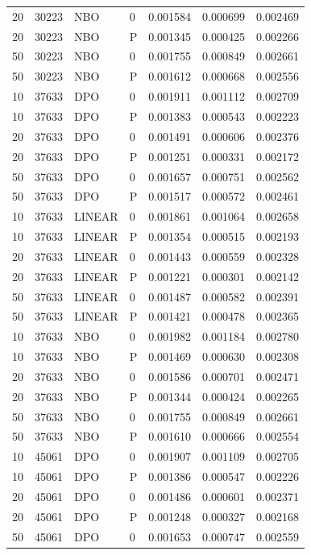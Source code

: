 \begin{longtable}{rrllrrr}
20 & 30223 & NBO & 0 & 0.001584 & 0.000699 & 0.002469\\
20 & 30223 & NBO & P & 0.001345 & 0.000425 & 0.002266\\
50 & 30223 & NBO & 0 & 0.001755 & 0.000849 & 0.002661\\
50 & 30223 & NBO & P & 0.001612 & 0.000668 & 0.002556\\
10 & 37633 & DPO & 0 & 0.001911 & 0.001112 & 0.002709\\
10 & 37633 & DPO & P & 0.001383 & 0.000543 & 0.002223\\
20 & 37633 & DPO & 0 & 0.001491 & 0.000606 & 0.002376\\
20 & 37633 & DPO & P & 0.001251 & 0.000331 & 0.002172\\
50 & 37633 & DPO & 0 & 0.001657 & 0.000751 & 0.002562\\
50 & 37633 & DPO & P & 0.001517 & 0.000572 & 0.002461\\
10 & 37633 & LINEAR & 0 & 0.001861 & 0.001064 & 0.002658\\
10 & 37633 & LINEAR & P & 0.001354 & 0.000515 & 0.002193\\
20 & 37633 & LINEAR & 0 & 0.001443 & 0.000559 & 0.002328\\
20 & 37633 & LINEAR & P & 0.001221 & 0.000301 & 0.002142\\
50 & 37633 & LINEAR & 0 & 0.001487 & 0.000582 & 0.002391\\
50 & 37633 & LINEAR & P & 0.001421 & 0.000478 & 0.002365\\
10 & 37633 & NBO & 0 & 0.001982 & 0.001184 & 0.002780\\
10 & 37633 & NBO & P & 0.001469 & 0.000630 & 0.002308\\
20 & 37633 & NBO & 0 & 0.001586 & 0.000701 & 0.002471\\
20 & 37633 & NBO & P & 0.001344 & 0.000424 & 0.002265\\
50 & 37633 & NBO & 0 & 0.001755 & 0.000849 & 0.002661\\
50 & 37633 & NBO & P & 0.001610 & 0.000666 & 0.002554\\
10 & 45061 & DPO & 0 & 0.001907 & 0.001109 & 0.002705\\
10 & 45061 & DPO & P & 0.001386 & 0.000547 & 0.002226\\
20 & 45061 & DPO & 0 & 0.001486 & 0.000601 & 0.002371\\
20 & 45061 & DPO & P & 0.001248 & 0.000327 & 0.002168\\
50 & 45061 & DPO & 0 & 0.001653 & 0.000747 & 0.002559\\

\end{longtable}
